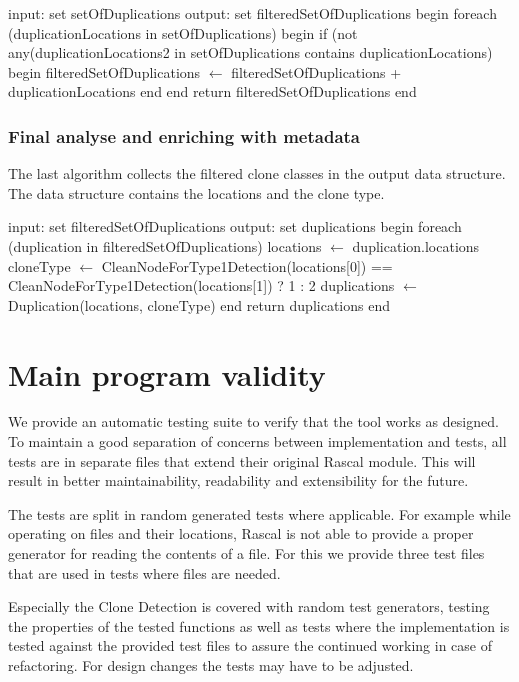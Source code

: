 \documentclass{uva-inf-article}
\begin{document}
\begin{pseudocode}[caption={Filtering the set of duplications.}, label={alg3}]
input: set setOfDuplications
output: set filteredSetOfDuplications
begin
  foreach (duplicationLocations in setOfDuplications)
    begin
      if (not any(duplicationLocations2 in setOfDuplications contains duplicationLocations)
      begin
        filteredSetOfDuplications  $\gets$ filteredSetOfDuplications + duplicationLocations
      end
    end
  return filteredSetOfDuplications
end
\end{pseudocode}

\subsubsection{Final analyse and enriching with metadata}

The last algorithm collects the filtered clone classes in the output data structure.
The data structure contains the locations and the clone type. 

\begin{pseudocode}[caption={Final analyse and enriching with metadata.}, label={alg4}]
 input: set filteredSetOfDuplications
 output: set duplications
 begin
   foreach (duplication in filteredSetOfDuplications)
    locations $\gets$ duplication.locations
    cloneType $\gets$ CleanNodeForType1Detection(locations[0]) == CleanNodeForType1Detection(locations[1]) ? 1 : 2
    duplications $\gets$ Duplication(locations, cloneType)
   end
  return duplications
 end       
\end{pseudocode}

\section{Main program validity}

We provide an automatic testing suite to verify that the tool works as designed. To maintain a good separation of concerns between implementation and tests, all tests are in separate files that extend their original Rascal module. This will result in better maintainability, readability and extensibility for the future. 

The tests are split in random generated tests where applicable. For example while operating on files and their locations, Rascal is not able to provide a proper generator for reading the contents of a file. For this we provide three test files that are used in tests where files are needed. 

Especially the Clone Detection is covered with random test generators, testing the properties of the tested functions as well as tests where the implementation is tested against the provided test files to assure the continued working in case of refactoring. For design changes the tests may have to be adjusted.
\end{document}
